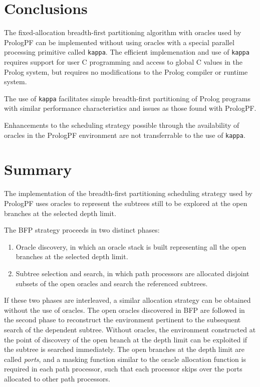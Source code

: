 \section{Conclusions} %

The fixed-allocation 
breadth-first partitioning algorithm with oracles used by PrologPF can be
implemented without using oracles with a special parallel processing primitive
called \texttt{kappa}.  The efficient implemenation and use of \texttt{kappa} requires
support for user C programming and access to global C values in the Prolog system, but
requires no modifications to the Prolog compiler or runtime system.

The use of \texttt{kappa} facilitates simple breadth-first partitioning of Prolog
programs with similar performance
characteristics and issues as those found with PrologPF.

Enhancements to the scheduling strategy possible through the availability of oracles in
the PrologPF environment are not transferrable to the use of \texttt{kappa}.

\section{Summary} %

The implementation of the breadth-first partitioning scheduling strategy used by
PrologPF uses oracles to represent the subtrees still to be explored at the open
branches at the selected depth limit.

The BFP strategy proceeds in two distinct phases:
\begin{enumerate}
\item{Oracle discovery, in which an oracle stack is built representing all the
  open branches at the selected depth limit.}
\item{Subtree selection and search, in which path processors are allocated disjoint
  subsets of the open oracles and search the referenced subtrees.}
\end{enumerate}

If these two phases are interleaved, a similar allocation strategy can be obtained
without the use of oracles.  The open oracles discovered in BFP are followed in the
second phase to reconstruct the environment pertinent to the subsequent search of
the dependent subtree.  Without oracles, the environment constructed at the point of
discovery of the open branch at the depth limit can be exploited if the
subtree is searched immediately.  The open branches at the depth limit are called
\textit{ports}, and a masking function similar to the oracle allocation function
is required in each path processor, such that each processor skips over the ports
allocated to other path processors.

